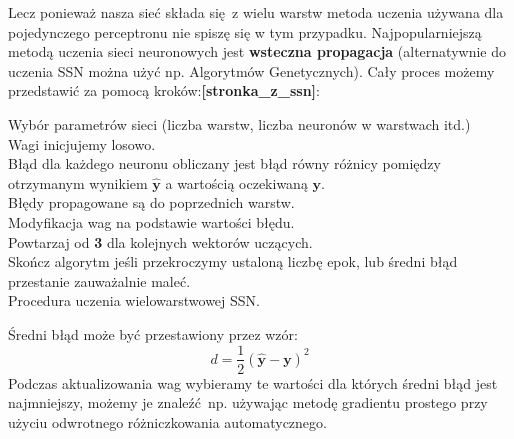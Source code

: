 \documentclass{article}
\renewcommand{\vec}[1]{\mathbf{#1}}
\begin{document}
Lecz ponieważ nasza sieć składa się z wielu warstw metoda uczenia używana dla pojedynczego
perceptronu nie spiszę się w tym przypadku. Najpopularniejszą metodą uczenia sieci neuronowych 
jest \textbf{wsteczna propagacja} (alternatywnie do uczenia SSN można użyć np. Algorytmów
Genetycznych). Cały proces możemy przedstawić za pomocą kroków:\textbf{[stronka\_z\_ssn]}:

{\LinesNumbered
\begin{algorithm}[H]
 Wybór parametrów sieci (liczba warstw, liczba neuronów w warstwach itd.)\\
 Wagi inicjujemy losowo.\\
 Błąd dla każdego neuronu obliczany jest błąd równy różnicy pomiędzy otrzymanym
 wynikiem $\hat{\vec{y}}$ a wartością oczekiwaną $\vec{y}$.\\
 Błędy propagowane są do poprzednich warstw.\\
 Modyfikacja wag na podstawie wartości błędu.\\
 Powtarzaj od \textbf{3} dla kolejnych wektorów uczących.\\
 Skończ algorytm jeśli przekroczymy ustaloną liczbę epok, lub średni błąd przestanie zauważalnie
 maleć.\\
 \caption{Procedura uczenia wielowarstwowej SSN.}
\end{algorithm}}
Średni błąd może być przestawiony przez wzór:
\begin{equation}
	d = \frac{1}{2}(\hat{\vec{y}} - \vec{y})^2
\end{equation}
Podczas aktualizowania wag wybieramy te wartości dla których średni błąd jest najmniejszy, możemy
je znaleźć np. używając metodę gradientu prostego przy użyciu odwrotnego różniczkowania
automatycznego.
\end{document}
